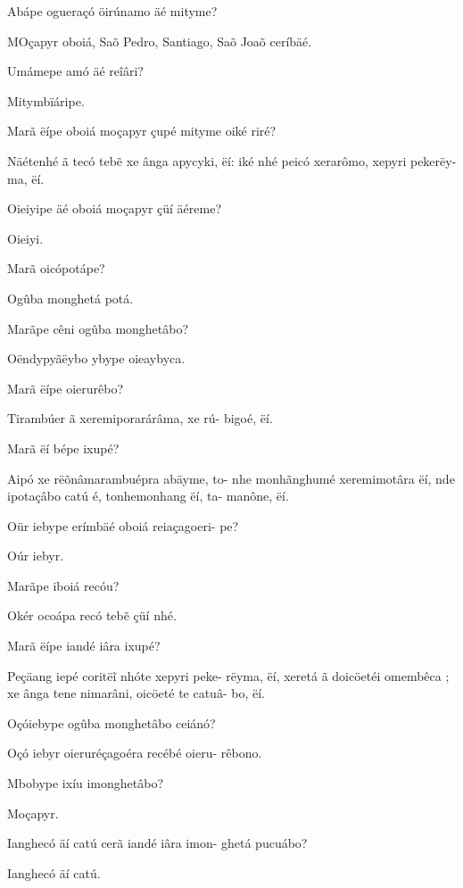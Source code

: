 \documentclass[openany,titlepage,12pt]{book}
\begin{document}
\begin{alternate}
    \item Abápe ogueraçó öirúnamo äé mityme?
    \item MOçapyr oboiá, Saõ Pedro, Santiago, Saõ
    Joaõ ceríbäé.
    \item Umámepe amó äé reîâri?
    \item Mitymbïáripe.
    \item Marã ëípe oboiá moçapyr çupé mityme
    oiké riré?
    \item Näétenhé ã tecó teb\~e xe ânga apycyki, ëí:
    iké nhé peicó xerarômo, xepyri pekerëy-
    ma, ëí.
    \item Oieiyipe äé oboiá moçapyr çüí äéreme?
    \item Oieiyi.
    \item Marã oicópotápe?
    \item Ogûba monghetá potá.
    \item Marãpe cêni ogûba monghetâbo?
    \item Oëndypyãëybo ybype oieaybyca.
    \item Marã ëípe oierurêbo?
    \item Tirambúer ã xeremiporarárâma, xe rú-
    bigoé, ëí.
    \item Marã ëí bépe ixupé?
    \item Aipó xe rëõnâmarambuépra abäyme, to-
    nhe monhãnghumé xeremimotâra ëí, nde
    ipotaçâbo catú é, tonhemonhang ëí, ta-
    manône, ëí.
    \item Oür iebype erímbäé oboiá reiaçagoeri-
    pe?
    \item Oúr iebyr.
    \item Marãpe iboiá recóu?
    \item Okér ocoápa recó teb\~e çüí nhé.
    \item Marã ëípe iandé iâra ixupé?
    \item Peçäang iepé coritë\~i nhóte xepyri peke-
    rëyma, ëí, xeretá ã doicöetéi omembêca ;
    xe ânga tene nimarâni, oicöeté te catuâ-
    bo, ëí.\pagebreak
    \item Oçóiebype ogûba monghetâbo ceiánó?
    \item Oçó iebyr oieruréçagoéra recébé oieru-
    rêbono.
    \item Mbobype ixíu imonghetâbo?
    \item Moçapyr.
    \item Ianghecó äí catú cerã iandé iâra imon-
    ghetá pucuábo?
    \item Ianghecó äí catú.

\end{alternate}
\end{document}
